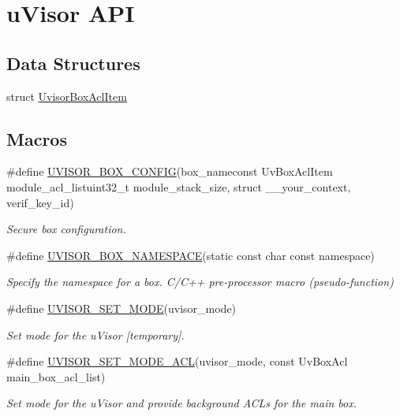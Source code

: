 \hypertarget{group__hypervisor}{}\section{u\+Visor A\+PI}
\label{group__hypervisor}
\subsection*{Data Structures}
\begin{DoxyCompactItemize}
\item
struct \hyperlink{group__hypervisor_struct_uvisor_box_acl_item}{Uvisor\+Box\+Acl\+Item}
\end{DoxyCompactItemize}
\subsection*{Macros}
\begin{DoxyCompactItemize}
\item
\#define \hyperlink{group__hypervisor_ga6143739a0475a71e8002f540de3c53f0}{U\+V\+I\+S\+O\+R\+\_\+\+B\+O\+X\+\_\+\+C\+O\+N\+F\+IG}(box\+\_\+nameconst Uv\+Box\+Acl\+Item module\+\_\+acl\+\_\+listuint32\+\_\+t module\+\_\+stack\+\_\+size, struct \+\_\+\+\_\+your\+\_\+context, verif\+\_\+key\+\_\+id)
\begin{DoxyCompactList}\small\item\em Secure box configuration. \end{DoxyCompactList}\item
\#define \hyperlink{group__hypervisor_gafe52bfcc466d459d149c63966c2f4a58}{U\+V\+I\+S\+O\+R\+\_\+\+B\+O\+X\+\_\+\+N\+A\+M\+E\+S\+P\+A\+CE}(static const char const namespace)
\begin{DoxyCompactList}\small\item\em Specify the namespace for a box. C/\+C++ pre-\/processor macro (pseudo-\/function) \end{DoxyCompactList}\item
\#define \hyperlink{group__hypervisor_ga7cb080278fc7d660addf9bbff6d3f2da}{U\+V\+I\+S\+O\+R\+\_\+\+S\+E\+T\+\_\+\+M\+O\+DE}(uvisor\+\_\+mode)
\begin{DoxyCompactList}\small\item\em Set mode for the u\+Visor \mbox{[}temporary\mbox{]}. \end{DoxyCompactList}\item
\#define \hyperlink{group__hypervisor_gae90f548ce110da855610f79301aafe34}{U\+V\+I\+S\+O\+R\+\_\+\+S\+E\+T\+\_\+\+M\+O\+D\+E\+\_\+\+A\+CL}(uvisor\+\_\+mode, const Uv\+Box\+Acl main\+\_\+box\+\_\+acl\+\_\+list)
\begin{DoxyCompactList}\small\item\em Set mode for the u\+Visor and provide background A\+C\+Ls for the main box. \end{DoxyCompactList}\end{DoxyCompactItemize}
